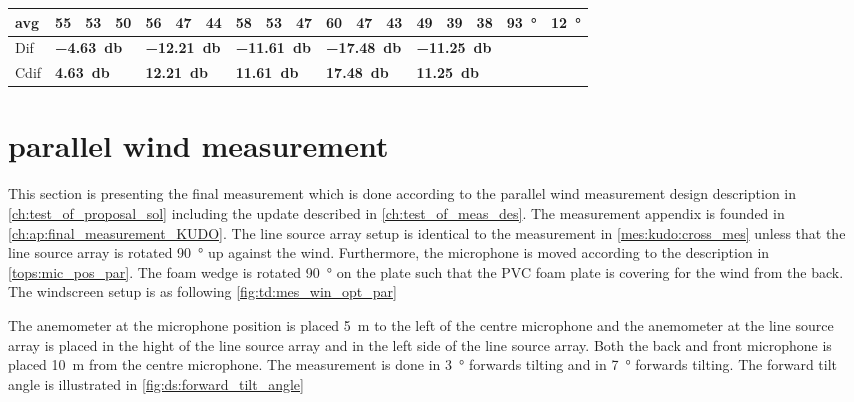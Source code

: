 \begin{table}[H]
\begin{tabular}{l|l|l|l|l|l|l|l|l|l|l|l|l|l|l|l|l|l}
avg &  55    &  53    &  50    &  56    & 47     &  44    &   58   &  53     &  47    &  60     &   47   &  43    & 49 & 39  & 38  & \SI{93}{\degree} & \SI{12}{\degree} \\ \hline  
Dif & \multicolumn{3}{l|}{\textbf{\SI{-4.63}{\decibel}}} & \multicolumn{3}{l|}{\textbf{\SI{-12.21}{\decibel}}} & \multicolumn{3}{l|}{\textbf{\SI{-11.61}{\decibel}}} & \multicolumn{3}{l|}{\textbf{\SI{-17.48}{\decibel}}} & \multicolumn{3}{l|}{\textbf{\SI{-11.25}{\decibel}}}   &  \multicolumn{2}{l}{}    \\  \hline 
Cdif & \multicolumn{3}{l|}{\textbf{\SI{4.63}{\decibel}}} & \multicolumn{3}{l|}{\textbf{\SI{12.21}{\decibel}}} & \multicolumn{3}{l|}{\textbf{\SI{11.61}{\decibel}}} & \multicolumn{3}{l|}{\textbf{\SI{17.48}{\decibel}}} & \multicolumn{3}{l|}{\textbf{\SI{11.25}{\decibel}}}  &   \multicolumn{2}{l}{}                          
\end{tabular}
\label{meas:result_cross_7_8}
\end{table}




\section{parallel wind measurement}\label{mes:kudo:par_mes}
This section is presenting the final measurement which is done according to the parallel wind measurement design description in \autoref{ch:test_of_proposal_sol} including the update described in \autoref{ch:test_of_meas_des}. The measurement appendix is founded in \autoref{ch:ap:final_measurement_KUDO}. The line source array setup is identical to the measurement in \autoref{mes:kudo:cross_mes} unless that the line source array is rotated \SI{90}{\degree} up against the wind. Furthermore, the microphone is moved according to the description in \autoref{tops:mic_pos_par}. The foam wedge is rotated \SI{90}{\degree} on the plate such that the PVC foam plate is covering for the wind from the back. The windscreen setup is as following \autoref{fig:td:mes_win_opt_par}   



The anemometer at the microphone position is placed \SI{5}{\meter} to the left of the centre microphone and the anemometer at the line source array is placed in the hight of the line source array and in the left side of the line source array. Both the back and front microphone is placed \SI{10}{\meter} from the centre microphone. The measurement is done in \SI{3}{\degree} forwards tilting and in \SI{7}{\degree} forwards tilting. The forward tilt angle is illustrated in \autoref{fig:ds:forward_tilt_angle}

